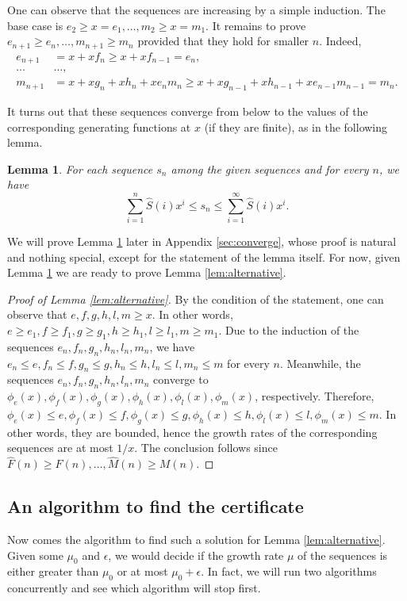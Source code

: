 \documentclass[a4paper,12pt]{article}
\newtheorem{lemma}{Lemma}
\begin{document}
One can observe that the sequences are increasing by a simple induction. The base case is $e_2\ge x=e_1,\dots, m_2\ge x=m_1$. It remains to prove $e_{n+1}\ge e_n, \dots, m_{n+1}\ge m_n$ provided that they hold for smaller $n$. Indeed,
\begin{align*}
    e_{n+1}&=x+xf_n \ge x+xf_{n-1} = e_n,\\
    \dots&\dots,\\
    m_{n+1} &= x + x g_n + x h_n + x e_n m_n \ge x + x g_{n-1} + x h_{n-1} + x e_{n-1} m_{n-1} = m_n.
\end{align*}

It turns out that these sequences converge from below to the values of the corresponding generating functions at $x$ (if they are finite), as in the following lemma.
\begin{lemma} \label{lem:converge}
	For each sequence $s_n$ among the given sequences and for every $n$, we have
	\[
		\sum_{i=1}^n \hat{S}(i)x^i \le s_n \le \sum_{i=1}^\infty \hat{S}(i)x^i.
	\]
\end{lemma}

We will prove Lemma \ref{lem:converge} later in Appendix \ref{sec:converge}, whose proof is natural and nothing special, except for the statement of the lemma itself. For now, given Lemma \ref{lem:converge} we are ready to prove Lemma \ref{lem:alternative}.
\begin{proof}[Proof of Lemma \ref{lem:alternative}]
	By the condition of the statement, one can observe that $e,f,g,h,l,m \ge x$. In other words, $e\ge e_1, f\ge f_1, g\ge g_1, h\ge h_1, l\ge l_1, m\ge m_1$.
    Due to the induction of the sequences $e_n,f_n,g_n,h_n,l_n,m_n$, we have $e_n\le e, f_n\le f, g_n\le g, h_n\le h, l_n\le l, m_n\le m$ for every $n$. Meanwhile, the sequences $e_n,f_n,g_n,h_n,l_n,m_n$ converge to $\phi_e(x),\phi_f(x),\phi_g(x),\phi_h(x),\phi_l(x),\phi_m(x)$, respectively. Therefore, $\phi_e(x)\le e,\phi_f(x)\le f,\phi_g(x)\le g,\phi_h(x) \le h,\phi_l(x) \le l,\phi_m(x) \le m$. In other words, they are bounded, hence the growth rates of the corresponding sequences are at most $1/x$. The conclusion follows since $\hat{F}(n)\ge F(n), \dots, \hat{M}(n)\ge M(n)$.
\end{proof}

\subsection*{An algorithm to find the certificate}
Now comes the algorithm to find such a solution for Lemma \ref{lem:alternative}.
Given some $\mu_0$ and $\epsilon$, we would decide if the growth rate $\mu$ of the sequences is either greater than $\mu_0$ or at most $\mu_0+\epsilon$. In fact, we will run two algorithms concurrently and see which algorithm will stop first.
\end{document}

